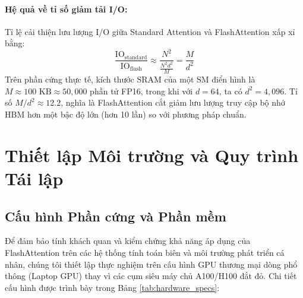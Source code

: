 \documentclass[10pt,a4paper]{article}
\begin{document}
\paragraph{Hệ quả về tỉ số giảm tải I/O:} Tỉ lệ cải thiện lưu lượng I/O giữa Standard Attention và FlashAttention xấp xỉ bằng:
\begin{equation}
\label{eq:io_speedup_ratio}
\frac{\text{IO}_{\text{standard}}}{\text{IO}_{\text{flash}}} \approx \frac{N^2}{\frac{N^2 d^2}{M}} = \frac{M}{d^2}
\end{equation}
Trên phần cứng thực tế, kích thước SRAM của một SM điển hình là $M \approx 100\text{ KB} \approx 50{,}000$ phần tử FP16, trong khi với $d = 64$, ta có $d^2 = 4{,}096$. Tỉ số $M / d^2 \approx 12.2$, nghĩa là FlashAttention cắt giảm lưu lượng truy cập bộ nhớ HBM hơn một bậc độ lớn (hơn 10 lần) so với phương pháp chuẩn.

\section{Thiết lập Môi trường và Quy trình Tái lập}
\label{sec:methodology}

\subsection{Cấu hình Phần cứng và Phần mềm}
Để đảm bảo tính khách quan và kiểm chứng khả năng áp dụng của FlashAttention trên các hệ thống tính toán biên và môi trường phát triển cá nhân, chúng tôi thiết lập thực nghiệm trên cấu hình GPU thương mại dòng phổ thông (Laptop GPU) thay vì các cụm siêu máy chủ A100/H100 đắt đỏ. Chi tiết cấu hình được trình bày trong Bảng \ref{tab:hardware_specs}:
\end{document}
